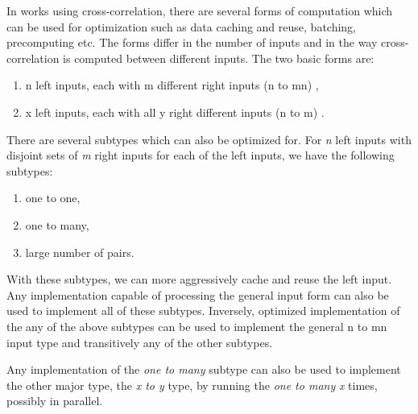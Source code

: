 In works using cross-correlation, there are several forms of computation which can be used for optimization such as data caching and reuse, batching, precomputing etc. The forms differ in the number of inputs and in the way cross-correlation is computed between different inputs. 
The two basic forms are:

\begin{enumerate}
	\item n left inputs, each with m different right inputs (n to mn) \citet{misko} \citet{zhang2015} \citet{Kapinchev2015}, 
	\item x left inputs, each with all y right different inputs (n to m) \citet{Clark2011}.
\end{enumerate} 

There are several subtypes which can also be optimized for. For \textit{n} left inputs with disjoint sets of \textit{m} right inputs for each of the left inputs, we have the following subtypes:

\begin{enumerate}
	\item one to one,
	\item one to many,
	\item large number of pairs.
\end{enumerate}

With these subtypes, we can more aggressively cache and reuse the left input. Any implementation capable of processing the general input form can also be used to implement all of these subtypes.
Inversely, optimized implementation of the any of the above subtypes can be used to implement the general n to mn input type and transitively any of the other subtypes.

Any implementation of the \textit{one to many} subtype can also be used to implement the other major type, the \textit{x to y} type, by running the \textit{one to many} \textit{x} times, possibly in parallel.


